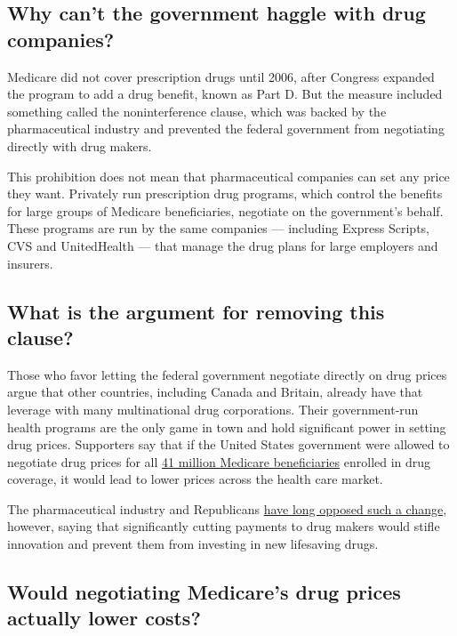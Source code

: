 \hypertarget{why-cant-the-government-haggle-with-drug-companies}{%
\subsection{Why can't the government haggle with drug
companies?}\label{why-cant-the-government-haggle-with-drug-companies}}

Medicare did not cover prescription drugs until 2006, after Congress
expanded the program to add a drug benefit, known as Part D. But the
measure included something called the noninterference clause, which was
backed by the pharmaceutical industry and prevented the federal
government from negotiating directly with drug makers.

This prohibition does not mean that pharmaceutical companies can set any
price they want. Privately run prescription drug programs, which control
the benefits for large groups of Medicare beneficiaries, negotiate on
the government's behalf. These programs are run by the same companies
--- including Express Scripts, CVS and UnitedHealth --- that manage the
drug plans for large employers and insurers.

\hypertarget{what-is-the-argument-for-removing-this-clause}{%
\subsection{What is the argument for removing this
clause?}\label{what-is-the-argument-for-removing-this-clause}}

Those who favor letting the federal government negotiate directly on
drug prices argue that other countries, including Canada and Britain,
already have that leverage with many multinational drug corporations.
Their government-run health programs are the only game in town and hold
significant power in setting drug prices. Supporters say that if the
United States government were allowed to negotiate drug prices for all
\href{http://kff.org/medicare/fact-sheet/the-medicare-prescription-drug-benefit-fact-sheet/}{41
million Medicare beneficiaries} enrolled in drug coverage, it would lead
to lower prices across the health care market.

The pharmaceutical industry and Republicans
\href{http://www.phrma.org/advocacy/medicare/partd}{have long opposed
such a change}, however, saying that significantly cutting payments to
drug makers would stifle innovation and prevent them from investing in
new lifesaving drugs.

\hypertarget{would-negotiating-medicares-drug-prices-actually-lower-costs}{%
\subsection{Would negotiating Medicare's drug prices actually lower
costs?}\label{would-negotiating-medicares-drug-prices-actually-lower-costs}}

